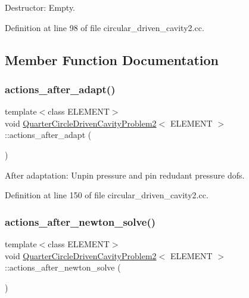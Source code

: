 Destructor\+: Empty. 



Definition at line 98 of file circular\+\_\+driven\+\_\+cavity2.\+cc.



\subsection{Member Function Documentation}
\mbox{\label{classQuarterCircleDrivenCavityProblem2_a51d108d18f50d81bad0da998741254a9}} 
\subsubsection{\texorpdfstring{actions\+\_\+after\+\_\+adapt()}{actions\_after\_adapt()}}
{\footnotesize\ttfamily template$<$class E\+L\+E\+M\+E\+NT$>$ \\
void \hyperlink{classQuarterCircleDrivenCavityProblem2}{Quarter\+Circle\+Driven\+Cavity\+Problem2}$<$ E\+L\+E\+M\+E\+NT $>$\+::actions\+\_\+after\+\_\+adapt (\begin{DoxyParamCaption}{ }\end{DoxyParamCaption})\hspace{0.3cm}{\ttfamily [inline]}}



After adaptation\+: Unpin pressure and pin redudant pressure dofs. 



Definition at line 150 of file circular\+\_\+driven\+\_\+cavity2.\+cc.

\mbox{\label{classQuarterCircleDrivenCavityProblem2_a1417ca3cc4a838d407c8bf85372dfc8f}} 
\subsubsection{\texorpdfstring{actions\+\_\+after\+\_\+newton\+\_\+solve()}{actions\_after\_newton\_solve()}}
{\footnotesize\ttfamily template$<$class E\+L\+E\+M\+E\+NT$>$ \\
void \hyperlink{classQuarterCircleDrivenCavityProblem2}{Quarter\+Circle\+Driven\+Cavity\+Problem2}$<$ E\+L\+E\+M\+E\+NT $>$\+::actions\+\_\+after\+\_\+newton\+\_\+solve (\begin{DoxyParamCaption}{ }\end{DoxyParamCaption})\hspace{0.3cm}{\ttfamily [inline]}}



